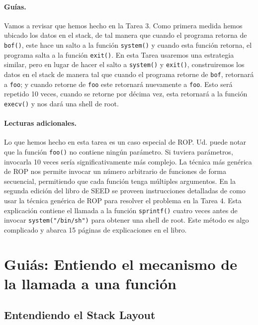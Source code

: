 \paragraph{Guías.} Vamos a revisar que hemos hecho en la Tarea 3. Como primera medida hemos ubicado los datos en el stack, de tal manera que cuando el programa retorna de \texttt{bof()}, este hace un salto a la función \texttt{system()} y cuando esta función retorna, el programa salta a la función \texttt{exit()}.
En esta Tarea usaremos una estrategia similar, pero en lugar de hacer el salto a \texttt{system()} y \texttt{exit()}, construiremos los datos en el stack de manera tal que cuando el programa retorne de \texttt{bof}, retornará a  \texttt{foo}; y cuando retorne de \texttt{foo} este retornará nuevamente a \texttt{foo}.
Esto será repetido 10 veces, cuando se retorne por décima vez, esta retornará a la función \texttt{execv()} y nos dará una shell de root.



\paragraph{Lecturas adicionales.} Lo que hemos hecho en esta tarea es un caso especial de ROP. Ud. puede notar que la función \texttt{foo()} no contiene ningún parámetro. Si tuviera parámetros, invocarla 10 veces sería significativamente más complejo. La técnica más genérica de ROP nos permite invocar un número arbitrario de funciones de forma secuencial, permitiendo que cada función tenga múltiples argumentos.
En la segunda edición del libro de SEED se proveen instrucciones detalladas de como usar la técnica genérica de ROP para resolver el problema en la Tarea 4. Esta explicación contiene el llamada a la función \texttt{sprintf()} cuatro veces antes de invocar \texttt{system("/bin/sh")} para obtener una shell de root. Este método es algo complicado y abarca 15 páginas de explicaciones en el libro.



\section{Guiás: Entiendo el mecanismo de la llamada a una función}


\subsection{Entendiendo el Stack Layout}


